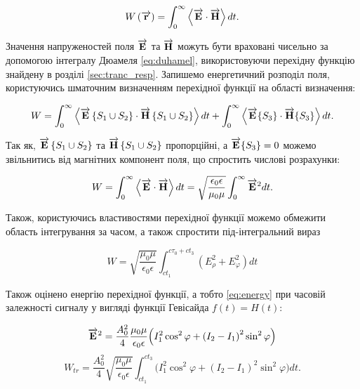 \begin{equation}
W \left( \overrightarrow{\mathbf r} \right) = \int_0^\infty \left< \overrightarrow{\mathbf E} \cdot \overrightarrow{\mathbf H} \right> dt.
\end{equation}

Значення напруженостей поля $ \overrightarrow{\mathbf E} $ та $ \overrightarrow{\mathbf H} $ можуть бути 
враховані чисельно за допомогою інтегралу Дюамеля \eqref{eq:duhamel},
використовуючи перехідну функцію знайдену в розділі \ref{sec:tranc_resp}.
Запишемо енергетичний розподіл поля, користуючись шматочним визначенням 
перехідної функції на області визначення:

\begin{equation}
W = \int_0^\infty 
\left< \overrightarrow{\mathbf E}\left\{S_1 \cup S_2\right\} \cdot \overrightarrow{\mathbf H}\left\{S_1 \cup S_2 \right\} \right> dt + 
\int_0^\infty \left< \overrightarrow{\mathbf E}\{S_3\} \cdot \overrightarrow{\mathbf H}\{S_3\} \right> dt.
\end{equation}

Так як, $ \overrightarrow{\mathbf E}\left\{S_1 \cup S_2\right\} $ та  
$ \overrightarrow{\mathbf H}\left\{S_1 \cup S_2 \right\}$ пропорційні, 
а $ \overrightarrow{\mathbf E}\{S_3\} = 0 $ можемо звільнитись від магнітних компонент 
поля, що спростить числові розрахунки:

\begin{equation}
W = \int_0^\infty \left< \overrightarrow{\mathbf E} \cdot \overrightarrow{\mathbf H} \right> dt =
\sqrt{\frac{\epsilon_0 \epsilon}{\mu_0 \mu}} \int_0^\infty \overrightarrow{\mathbf E}^2 dt.
\end{equation}

Також, користуючись властивостями перехідної функції можемо обмежити
область інтегрування за часом, а також спростити під-інтегральний вираз

\begin{equation} \label{eq:energy}
W = \sqrt{\frac{\mu_0 \mu}{\epsilon_0 \epsilon}}
\int_{ct_1}^{c\tau_0+ct_3} \left( E_\rho^2 + E_\varphi^2 \right) dt
\end{equation}

Також оцінено енергію перехідної функції, а тобто \ref{eq:energy} при 
часовій залежності сигналу у вигляді функції Гевісайда $ f(t) = H(t) $:

\textcolor{blue}{ \begin{equation*} \begin{aligned}
\overrightarrow{\mathbf E}^2 = \frac{A_0^2}{4} \frac{\mu_0 \mu}{\epsilon_0 \epsilon}
\Big( I_1^2 \cos^2 \varphi + \left( I_2 - I_1 \right)^2 \sin^2 \varphi \Big)
\end{aligned} \end{equation*} }
%
\begin{equation} \label{eq:energy_tr}
W_{tr} = \frac{A_0^2}{4} \sqrt{\frac{\mu_0 \mu}{\epsilon_0 \epsilon}}
\int_{ct_1}^{ct_3}  \Big( I_1^2 \cos^2 \varphi + 
\left( I_2 - I_1 \right)^2 \sin^2 \varphi \Big) dt.
\end{equation}

